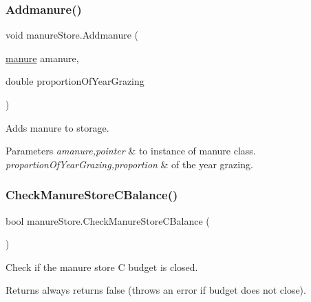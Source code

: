 \subsubsection{\texorpdfstring{Addmanure()}{Addmanure()}}
{\footnotesize\ttfamily void manure\+Store.\+Addmanure (\begin{DoxyParamCaption}\item[{\mbox{\hyperlink{classmanure}{manure}}}]{amanure,  }\item[{double}]{proportion\+Of\+Year\+Grazing }\end{DoxyParamCaption})\hspace{0.3cm}{\ttfamily [inline]}}



Adds manure to storage. 


\begin{DoxyParams}{Parameters}
{\em amanure,pointer} & to instance of manure class. \\
\hline
{\em proportion\+Of\+Year\+Grazing,proportion} & of the year grazing. \\
\hline
\end{DoxyParams}
\mbox{\label{classmanure_store_a15e3ef4a2d1ffe2d556b213ff2b5c378}} 
\subsubsection{\texorpdfstring{CheckManureStoreCBalance()}{CheckManureStoreCBalance()}}
{\footnotesize\ttfamily bool manure\+Store.\+Check\+Manure\+Store\+C\+Balance (\begin{DoxyParamCaption}{ }\end{DoxyParamCaption})\hspace{0.3cm}{\ttfamily [inline]}}



Check if the manure store C budget is closed. 

\begin{DoxyReturn}{Returns}
always returns false (throws an error if budget does not close). 
\end{DoxyReturn}
\mbox{\label{classmanure_store_a6aa8b1751c4d53ac68ec113efc055c1d}} 
